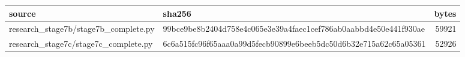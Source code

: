 \begin{tabular}{llr}
\toprule
source & sha256 & bytes \\
\midrule
research\_stage7b/stage7b\_complete.py & 99bce9be8b2404d758e4c065e3e39a4faec1cef786ab0aabbd4e50e441f930ae & 59921 \\
research\_stage7c/stage7c\_complete.py & 6c6a515fc96f65aaa0a99d5fecb90899e6beeb5dc50d6b32e715a62c65a05361 & 52926 \\
\bottomrule
\end{tabular}
